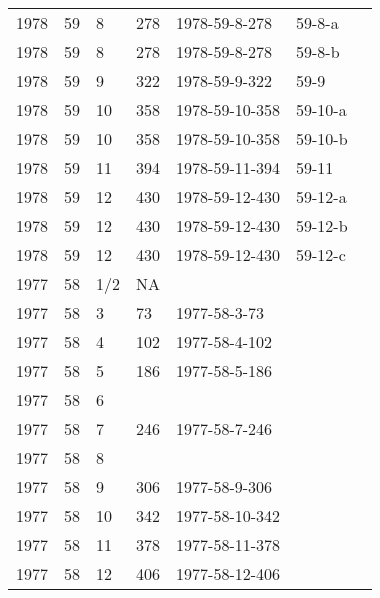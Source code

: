 \begin{longtable}{ |l|l|l|l|p{2.7cm}|l|p{2cm}| }
 1978 & 59 &     8 &     278 & 1978-59-8-278  & 59-8-a & \\
 1978 & 59 &     8 &     278 & 1978-59-8-278  & 59-8-b & \\
 1978 & 59 &     9 &     322 & 1978-59-9-322  & 59-9  & \\
 1978 & 59 &    10 &     358 & 1978-59-10-358 & 59-10-a & \\
 1978 & 59 &    10 &     358 & 1978-59-10-358 & 59-10-b & \\
 1978 & 59 &    11 &     394 & 1978-59-11-394 & 59-11 & \\
 1978 & 59 &    12 &     430 & 1978-59-12-430 & 59-12-a & \\
 1978 & 59 &    12 &     430 & 1978-59-12-430 & 59-12-b & \\
 1978 & 59 &    12 &     430 & 1978-59-12-430 & 59-12-c & \\
 1977 & 58 &   1/2 &      NA &                &  &  \\
 1977 & 58 &     3 &      73 & 1977-58-3-73   &  & \\
 1977 & 58 &     4 &     102 & 1977-58-4-102  &  & \\
 1977 & 58 &     5 &     186 & 1977-58-5-186  &  & \\
 1977 & 58 &     6 &         &                &  & \\
 1977 & 58 &     7 &     246 & 1977-58-7-246  &  & \\
 1977 & 58 &     8 &         &                &  & \\
 1977 & 58 &     9 &     306 & 1977-58-9-306  &  & \\
 1977 & 58 &    10 & 342     & 1977-58-10-342 &  & \\
 1977 & 58 &    11 &   378   & 1977-58-11-378 &  & \\
 1977 & 58 &    12 &    406  & 1977-58-12-406 &  & \\
\end{longtable}
